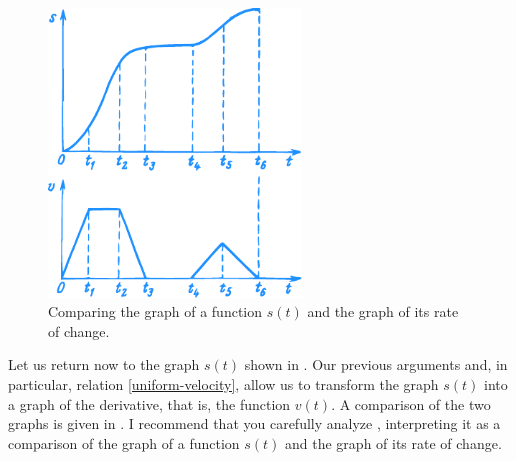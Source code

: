 {\begin{figure}[!ht]%
\centering
\includegraphics[width=0.6\textwidth]{figures/fig-35.pdf}
\caption{Comparing the graph of a function $s(t)$ and the graph of its rate
of change.}
\label{fig-35}
\end{figure}

Let us return now to the graph $s (t)$ shown in . Our previous arguments and, in particular, relation \eqref{uniform-velocity}, allow us to transform the graph $s (t)$ into a graph of the derivative, that is, the function $v (t)$. A comparison of the two graphs is given in . I recommend that you carefully analyze , interpreting it as a comparison of the graph of a function $s (t)$ and the graph of its rate of change.}